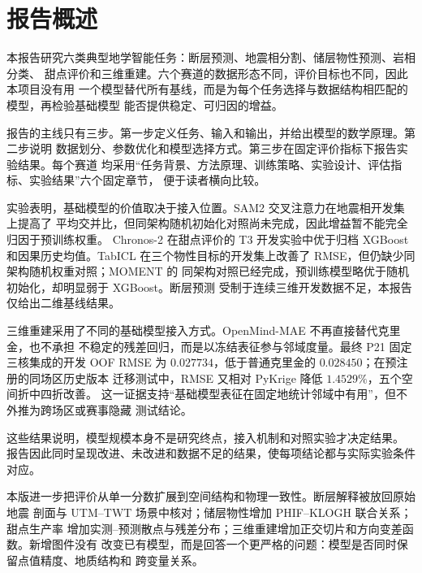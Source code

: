 \chapter{报告概述}

本报告研究六类典型地学智能任务：断层预测、地震相分割、储层物性预测、岩相分类、
甜点评价和三维重建。六个赛道的数据形态不同，评价目标也不同，因此本项目没有用
一个模型替代所有基线，而是为每个任务选择与数据结构相匹配的模型，再检验基础模型
能否提供稳定、可归因的增益。

报告的主线只有三步。第一步定义任务、输入和输出，并给出模型的数学原理。第二步说明
数据划分、参数优化和模型选择方式。第三步在固定评价指标下报告实验结果。每个赛道
均采用“任务背景、方法原理、训练策略、实验设计、评估指标、实验结果”六个固定章节，
便于读者横向比较。

实验表明，基础模型的价值取决于接入位置。SAM2 交叉注意力在地震相开发集上提高了
平均交并比，但同架构随机初始化对照尚未完成，因此增益暂不能完全归因于预训练权重。
Chronos-2 在甜点评价的 T3 开发实验中优于归档 XGBoost 和因果历史均值。TabICL
在三个物性目标的开发集上改善了 RMSE，但仍缺少同架构随机权重对照；MOMENT 的
同架构对照已经完成，预训练模型略优于随机初始化，却明显弱于 XGBoost。断层预测
受制于连续三维开发数据不足，本报告仅给出二维基线结果。

三维重建采用了不同的基础模型接入方式。OpenMind-MAE 不再直接替代克里金，也不承担
不稳定的残差回归，而是以冻结表征参与邻域度量。最终 P21 固定三核集成的开发 OOF
RMSE 为 $0.027734$，低于普通克里金的 $0.028450$；在预注册的同场区历史版本
迁移测试中，RMSE 又相对 PyKrige 降低 $1.4529\%$，五个空间折中四折改善。
这一证据支持“基础模型表征在固定地统计邻域中有用”，但不外推为跨场区或赛事隐藏
测试结论。

这些结果说明，模型规模本身不是研究终点，接入机制和对照实验才决定结果。
报告因此同时呈现改进、未改进和数据不足的结果，使每项结论都与实际实验条件对应。

本版进一步把评价从单一分数扩展到空间结构和物理一致性。断层解释被放回原始地震
剖面与 UTM--TWT 场景中核对；储层物性增加 PHIF--KLOGH 联合关系；甜点生产率
增加实测--预测散点与残差分布；三维重建增加正交切片和方向变差函数。新增图件没有
改变已有模型，而是回答一个更严格的问题：模型是否同时保留点值精度、地质结构和
跨变量关系。
